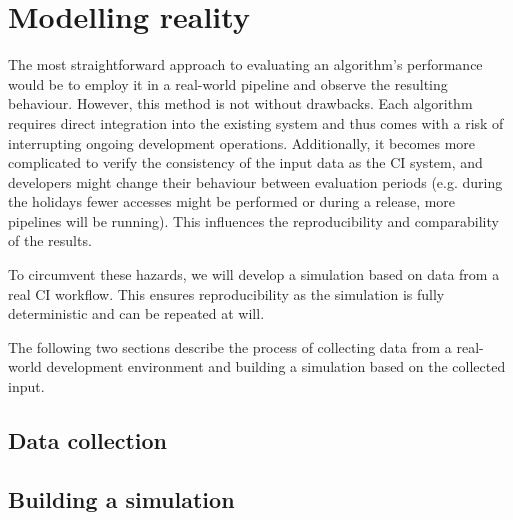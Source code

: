\section{Modelling reality}\label{sec:modelling-reality}
    The most straightforward approach to evaluating an algorithm's performance would be to employ it in a real-world pipeline and observe the resulting behaviour. However, this method is not without drawbacks. Each algorithm requires direct integration into the existing system and thus comes with a risk of interrupting ongoing development operations. Additionally, it becomes more complicated to verify the consistency of the input data as the CI system, and developers might change their behaviour between evaluation periods (e.g. during the holidays fewer accesses might be performed or during a release, more pipelines will be running). This influences the reproducibility and comparability of the results.
    
    To circumvent these hazards, we will develop a simulation based on data from a real CI workflow. This ensures reproducibility as the simulation is fully deterministic and can be repeated at will.
    
    The following two sections describe the process of collecting data from a real-world development environment and building a simulation based on the collected input.
    
    \subsection{Data collection}
        
    \subsection{Building a simulation}
        
